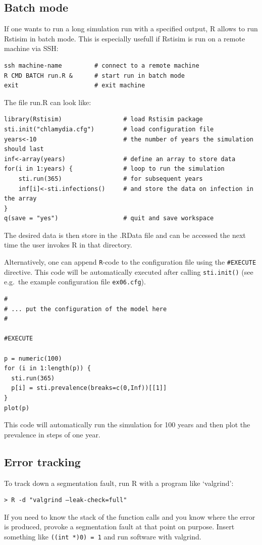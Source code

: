 \documentclass[11pt]{article}
\begin{document}
\subsection{Batch mode}
If one wants to run a long simulation run with a specified output, R allows to run Rstisim in batch mode. This is especially usefull if Rstisim is run on a remote machine via SSH:
\begin{verbatim}
ssh machine-name         # connect to a remote machine
R CMD BATCH run.R &      # start run in batch mode
exit                     # exit machine
\end{verbatim}
The file run.R can look like:
\begin{verbatim}
library(Rstisim)                 # load Rstisim package
sti.init("chlamydia.cfg")        # load configuration file
years<-10                        # the number of years the simulation should last
inf<-array(years)                # define an array to store data
for(i in 1:years) {              # loop to run the simulation
    sti.run(365)                 # for subsequent years
    inf[i]<-sti.infections()     # and store the data on infection in the array
}
q(save = "yes")                  # quit and save workspace
\end{verbatim}
The desired data is then store in the .RData file and can be accessed the next time the user invokes R in that directory.

Alternatively, one can append \texttt{R}-code to the configuration file using
the \verb|#EXECUTE| directive. This code will be automatically executed after
calling \verb|sti.init()| (see e.g.\ the example configuration
file \verb|ex06.cfg|).

\begin{verbatim}
#
# ... put the configuration of the model here
#

#EXECUTE

p = numeric(100)
for (i in 1:length(p)) {
  sti.run(365)
  p[i] = sti.prevalence(breaks=c(0,Inf))[[1]]
}
plot(p)
\end{verbatim}

This code will automatically run the simulation for 100 years and then plot the
prevalence in steps of one year.

\subsection{Error tracking}
To track down a segmentation fault, run R with a program like `valgrind':
\begin{verbatim}
> R -d "valgrind –leak-check=full"
\end{verbatim}
If you need to know the stack of the function calls and you know where the error
is produced, provoke a segmentation fault at that point on purpose. Insert
something like \texttt{((int *)0) = 1} and run software with valgrind.
\end{document}
